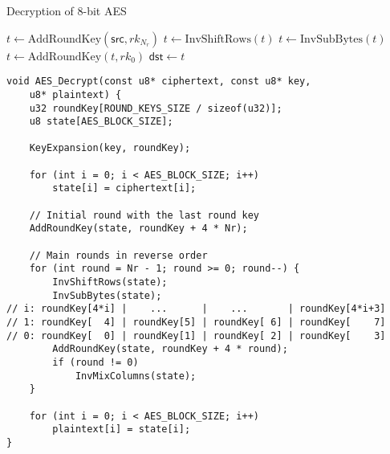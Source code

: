 \newpage
\begin{algorithm}[H]
	\caption{Decryption of 8-bit AES}
	
	\BlankLine
	$t \leftarrow \text{AddRoundKey}(\mathsf{src}, rk_{N_r})$\;
	$t \leftarrow \text{InvShiftRows}(t)$\;
	$t \leftarrow \text{InvSubBytes}(t)$\;
	$t \leftarrow \text{AddRoundKey}(t, rk_{0})$\;
	$\mathsf{dst} \leftarrow t$\;
	\;
\end{algorithm}
\vspace{18pt}
\begin{lstlisting}[style=C, caption={8-bit AES Decryption},captionpos=t]
void AES_Decrypt(const u8* ciphertext, const u8* key,
	u8* plaintext) {
	u32 roundKey[ROUND_KEYS_SIZE / sizeof(u32)];
	u8 state[AES_BLOCK_SIZE];
	
	KeyExpansion(key, roundKey);
	
	for (int i = 0; i < AES_BLOCK_SIZE; i++)
		state[i] = ciphertext[i];
	
	// Initial round with the last round key
	AddRoundKey(state, roundKey + 4 * Nr);
	
	// Main rounds in reverse order
	for (int round = Nr - 1; round >= 0; round--) {
		InvShiftRows(state);
		InvSubBytes(state);
// i: roundKey[4*i] |    ...      |    ...       | roundKey[4*i+3]
// 1: roundKey[  4] | roundKey[5] | roundKey[ 6] | roundKey[    7]
// 0: roundKey[  0] | roundKey[1] | roundKey[ 2] | roundKey[    3]
		AddRoundKey(state, roundKey + 4 * round);
		if (round != 0)
			InvMixColumns(state);
	}
	
	for (int i = 0; i < AES_BLOCK_SIZE; i++)
		plaintext[i] = state[i];
}
\end{lstlisting}

\newpage


